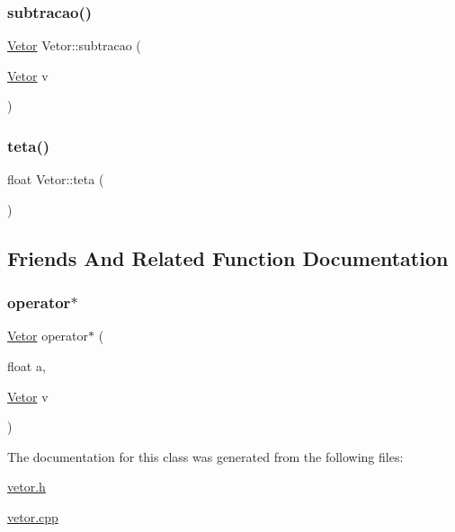\mbox{\label{class_vetor_aab0e480dfe6eaa15a5f58b1f44efcdb5}} 
\subsubsection{\texorpdfstring{subtracao()}{subtracao()}}
{\footnotesize\ttfamily \hyperlink{class_vetor}{Vetor} Vetor\+::subtracao (\begin{DoxyParamCaption}\item[{\hyperlink{class_vetor}{Vetor}}]{v }\end{DoxyParamCaption})}

\mbox{\label{class_vetor_ab9cd8d5a657eee8a0e0b4cda209b931d}} 
\subsubsection{\texorpdfstring{teta()}{teta()}}
{\footnotesize\ttfamily float Vetor\+::teta (\begin{DoxyParamCaption}{ }\end{DoxyParamCaption})}



\subsection{Friends And Related Function Documentation}
\mbox{\label{class_vetor_a94de46a0867046d0a49eb7e47b6d8e36}} 
\subsubsection{\texorpdfstring{operator$\ast$}{operator*}}
{\footnotesize\ttfamily \hyperlink{class_vetor}{Vetor} operator$\ast$ (\begin{DoxyParamCaption}\item[{float}]{a,  }\item[{\hyperlink{class_vetor}{Vetor}}]{v }\end{DoxyParamCaption})\hspace{0.3cm}{\ttfamily [friend]}}



The documentation for this class was generated from the following files\+:\begin{DoxyCompactItemize}
\item 
\hyperlink{vetor_8h}{vetor.\+h}\item 
\hyperlink{vetor_8cpp}{vetor.\+cpp}\end{DoxyCompactItemize}
